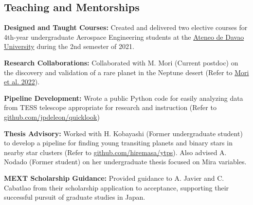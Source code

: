 \documentclass[11pt,letterpaper]{article}
\begin{document}
\subsection{Teaching and Mentorships}
\begin{list}{}{\cvlist}
    \item \textbf{Designed and Taught Courses:} Created and delivered two elective courses for 4th-year undergraduate Aerospace Engineering students at the \href{http://sea.addu.edu.ph/programs/aerospace-engineering/}{Ateneo de Davao University} during the 2nd semester of 2021.
    \item \textbf{Research Collaborations:} Collaborated with M. Mori (Current postdoc) on the discovery and validation of a rare planet in the Neptune desert (Refer to \href{https://ui.adsabs.harvard.edu/abs/2022AJ....163..298M/abstract}{Mori et al. 2022}).%
    \item \textbf{Pipeline Development:} Wrote a public Python code for easily analyzing data from TESS telescope appropriate for research and instruction (Refer to \href{https://github.com/jpdeleon/quicklook}{github.com/jpdeleon/quicklook})
    \item \textbf{Thesis Advisory:} Worked with H. Kobayashi (Former undergraduate student) to develop a pipeline for finding young transiting planets and binary stars in nearby star clusters (Refer to \href{https://github.com/hiremasa/ytps}{github.com/hiremasa/ytps}). Also advised A. Nodado (Former student) on her undergraduate thesis focused on Mira variables.
    \item \textbf{MEXT Scholarship Guidance:} Provided guidance to A. Javier and C. Cabatlao from their scholarship application to acceptance, supporting their successful pursuit of graduate studies in Japan.
\end{list}
\end{document}
